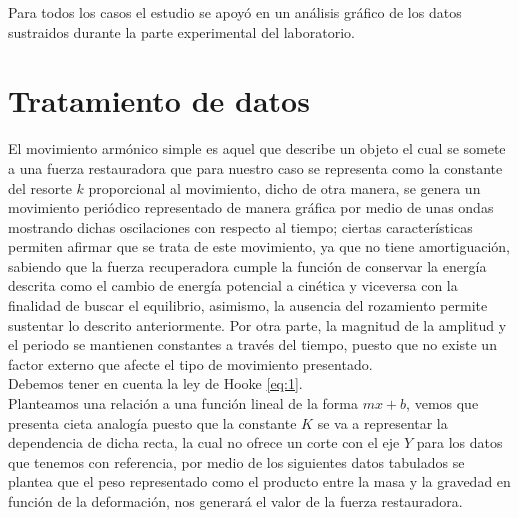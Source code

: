 \documentclass[spanish,notitlepage,letterpaper, 12pt]{article}
\begin{document}
Para todos los casos el estudio se apoyó en un análisis gráfico de los datos sustraidos durante la parte experimental del laboratorio. 
\section{Tratamiento de datos} \label{TD}
El movimiento armónico simple es aquel que describe un objeto el cual se somete a una fuerza restauradora que para nuestro caso se representa como la constante del resorte $k$ proporcional al movimiento, dicho de otra manera, se genera un movimiento periódico representado de manera gráfica por medio
de unas ondas mostrando dichas oscilaciones con respecto al tiempo; ciertas características permiten afirmar que se trata de este movimiento, ya que no tiene amortiguación, sabiendo que la fuerza recuperadora cumple la función de conservar la energía descrita como el cambio de energía potencial a
cinética y viceversa con la finalidad de buscar el equilibrio, asimismo, la ausencia del rozamiento permite sustentar lo descrito anteriormente. Por otra parte, la magnitud de la amplitud y el periodo se mantienen constantes a través del tiempo, puesto que no existe un factor externo que afecte el
tipo de movimiento presentado.\\

Debemos tener en cuenta la ley de Hooke \eqref{eq:1}.\\

Planteamos una relación a una función lineal de la forma $mx + b$, vemos que presenta cieta analogía puesto que la constante $K$ se va a representar la dependencia de dicha recta, la cual no ofrece un corte con el eje $Y$ para los datos que tenemos con referencia, por medio de los siguientes datos
tabulados se plantea que el peso representado como el producto entre la masa y la gravedad en función de la deformación, nos generará el valor de la fuerza restauradora.\\
\end{document}
